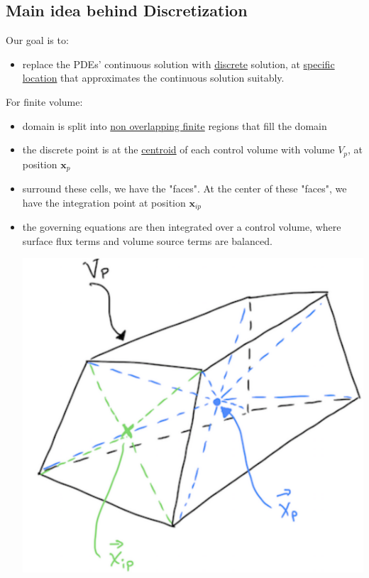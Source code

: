 \documentclass[14pt]{article}
\begin{document}
\subsection{Main idea behind Discretization}
\label{sec:orgb84b283}
Our goal is to:
\begin{itemize}
\item replace the PDEs' continuous solution with \uline{discrete} solution, at \uline{specific location} that approximates the continuous
solution suitably.
\end{itemize}
For finite volume:
\begin{itemize}
\item domain is split into \uline{non overlapping finite} regions that fill the domain
\item the discrete point is at the \uline{centroid} of each control volume with volume \(V_p\), at position \(\textbf{x}_p\)
\item surround these cells, we have the "faces". At the center of these "faces", we have the integration point at position
\(\textbf{x}_{ip}\)
\item the governing equations are then integrated over a control volume, where surface flux terms and volume source terms are
balanced. 
\begin{center}
\includegraphics[scale=0.2]{pic/finiteVolumeElement.png}
\end{center}
\end{itemize}
\end{document}
